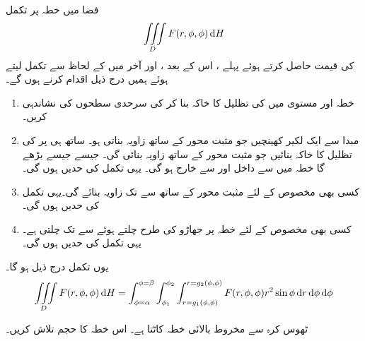 فضا میں خطہ  پر تکمل
\begin{align*}
\iiint\limits_D F(r,\phi,\phi)\dif H
\end{align*}
کی قیمت حاصل کرتے ہوئے  پہلے ، اس کے بعد ، اور آخر میں  کے لحاظ سے تکمل لیتے ہوئے ہمیں درج ذیل اقدام کرنے ہوں گے۔
\begin{enumerate}[1.]
\item
{}\quad
خطہ  اور مستوی  میں  کی تظلیل   کا خاکہ بنا کر  کی سرحدی سطحوں کی نشاندہی کریں۔
\item
{}\quad
مبدا سے ایک لکیر  کھینچیں جو مثبت محور  کے ساتھ زاویہ  بناتی ہو۔ ساتھ ہی  پر  کی تظلیل  کا خاکہ بنائیں جو مثبت  محور کے ساتھ زاویہ  بنائی گی۔ جیسے جیسے  بڑھے گا  خطہ  میں  سے داخل اور  سے خارج ہو گی۔ یہی تکمل کی  حدیں ہوں گی۔
\item
{}\quad
کسی بھی مخصوص  کے لئے   مثبت محور  کے ساتھ  سے  تک زاویہ بنائے گی۔یہی تکمل کی  حدیں ہوں گی۔
\item
{}\quad
کسی بھی مخصوص  کے لئے   خطہ  پر جھاڑو کی طرح چلتے ہوئے  سے  تک چلتی ہے۔  یہی تکمل کی  حدیں ہوں گی۔
\end{enumerate}
یوں تکمل درج ذیل ہو گا۔
\begin{align*}
\iiint\limits_D F(r,\phi,\phi)\dif H=\int_{\phi=\alpha}^{\phi=\beta}\int_{\phi_1}^{\phi_2}\int_{r=g_1(\phi,\phi)}^{r=g_2(\phi,\phi)} F(r,\phi,\phi) r^2\sin\phi \dif r\dif \phi \dif \phi
\end{align*} 

ٹھوس کرہ  سے مخروط  بالائی     خطہ  کاٹتا ہے۔ اس خطہ کا حجم تلاش کریں۔


